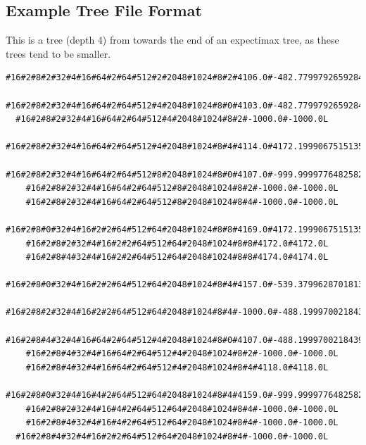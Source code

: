 \documentclass{article}
\begin{document}
\subsection{Example Tree File Format}
This is a tree (depth 4) from towards the end of an expectimax tree, as these trees tend to be smaller.
\begin{verbatim}
#16#2#8#2#32#4#16#64#2#64#512#2#2048#1024#8#2#4106.0#-482.77997926592843M
 #16#2#8#2#32#4#16#64#2#64#512#4#2048#1024#8#0#4103.0#-482.77997926592843C
  #16#2#8#2#32#4#16#64#2#64#512#4#2048#1024#8#2#-1000.0#-1000.0L
  #16#2#8#2#32#4#16#64#2#64#512#4#2048#1024#8#4#4114.0#4172.1999067515135M
   #16#2#8#2#32#4#16#64#2#64#512#8#2048#1024#8#0#4107.0#-999.9999776482582C
    #16#2#8#2#32#4#16#64#2#64#512#8#2048#1024#8#2#-1000.0#-1000.0L
    #16#2#8#2#32#4#16#64#2#64#512#8#2048#1024#8#4#-1000.0#-1000.0L
   #16#2#8#0#32#4#16#2#2#64#512#64#2048#1024#8#8#4169.0#4172.1999067515135C
    #16#2#8#2#32#4#16#2#2#64#512#64#2048#1024#8#8#4172.0#4172.0L
    #16#2#8#4#32#4#16#2#2#64#512#64#2048#1024#8#8#4174.0#4174.0L
 #16#2#8#0#32#4#16#2#2#64#512#64#2048#1024#8#4#4157.0#-539.3799628701813C
  #16#2#8#2#32#4#16#2#2#64#512#64#2048#1024#8#4#-1000.0#-488.1999700218439M
   #16#2#8#4#32#4#16#64#2#64#512#4#2048#1024#8#0#4107.0#-488.1999700218439C
    #16#2#8#4#32#4#16#64#2#64#512#4#2048#1024#8#2#-1000.0#-1000.0L
    #16#2#8#4#32#4#16#64#2#64#512#4#2048#1024#8#4#4118.0#4118.0L
   #16#2#8#0#32#4#16#4#2#64#512#64#2048#1024#8#4#4159.0#-999.9999776482582C
    #16#2#8#2#32#4#16#4#2#64#512#64#2048#1024#8#4#-1000.0#-1000.0L
    #16#2#8#4#32#4#16#4#2#64#512#64#2048#1024#8#4#-1000.0#-1000.0L
  #16#2#8#4#32#4#16#2#2#64#512#64#2048#1024#8#4#-1000.0#-1000.0L

\end{verbatim}
\newpage


\end{document}
